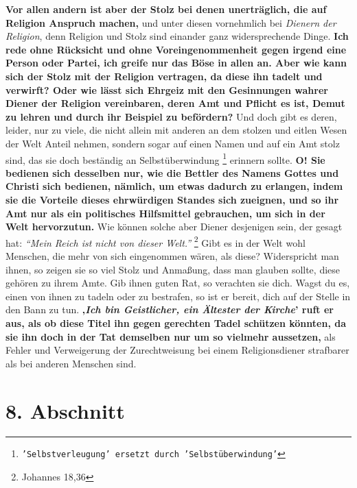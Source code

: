 \textbf{Vor allen andern ist aber der Stolz bei denen
unerträglich, die auf Religion
Anspruch machen,} und unter diesen vornehmlich bei \textit{Dienern der
Religion}, denn
Religion und Stolz sind einander ganz widersprechende Dinge. \textbf{Ich rede
ohne
Rücksicht und ohne Voreingenommenheit gegen irgend eine Person oder Partei, ich
greife nur das Böse in allen an. Aber wie kann sich der Stolz
mit der Religion
vertragen, da diese ihn tadelt und verwirft? Oder wie lässt sich Ehrgeiz mit den
Gesinnungen wahrer Diener der Religion vereinbaren, deren Amt und Pflicht es ist,
Demut zu lehren und durch ihr Beispiel zu befördern?} Und doch gibt es deren,
leider, nur zu viele, die nicht allein mit anderen an dem stolzen und eitlen
Wesen der Welt Anteil nehmen, sondern sogar auf einen Namen und auf ein Amt
stolz sind, das sie doch beständig an
Selbstüberwindung
\footnote{\texttt{'Selbstverleugung' ersetzt durch 'Selbstüberwindung'}}
erinnern sollte. \textbf{O! Sie
bedienen sich desselben nur, wie die Bettler des Namens Gottes und Christi sich
bedienen, nämlich, um etwas dadurch zu erlangen, indem sie die Vorteile dieses
ehrwürdigen Standes sich zueignen, und so ihr Amt nur als ein politisches
Hilfsmittel gebrauchen, um sich in der Welt hervorzutun.} Wie können solche
aber
Diener desjenigen sein, der gesagt hat:
\textit{"`Mein Reich ist nicht von dieser
Welt."'}
\footnote{Johannes 18,36}
Gibt es in der Welt wohl Menschen, die mehr von
sich eingenommen wären, als diese? Widerspricht man ihnen, so zeigen sie so viel
Stolz und Anmaßung, dass man glauben sollte, diese gehören zu ihrem Amte. Gib
ihnen guten Rat, so verachten sie dich. Wagst du es, einen von ihnen zu tadeln
oder zu bestrafen, so ist er bereit, dich auf der Stelle in den Bann
zu tun.
\textbf{‚\textit{Ich bin Geistlicher, ein Ältester der Kirche}’ ruft er aus,
als ob diese Titel
ihn gegen gerechten Tadel schützen könnten, da sie ihn doch in der Tat
demselben nur um so vielmehr aussetzen,} als Fehler und Verweigerung der
Zurechtweisung bei einem Religionsdiener strafbarer als bei anderen Menschen
sind.

\section{8. Abschnitt} \label{kap12_ab8}

